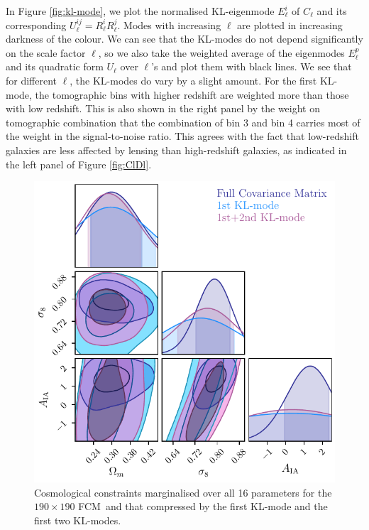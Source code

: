 \documentclass[twocolumn]{\docclass}
\newcommand{\rf}[1]{Figure \ref{fig:#1}}
\newcommand\full{FCM}
\begin{document}
	In \rf{kl-mode}, we plot the normalised KL-eigenmode $E_\ell^i$ of $C_{\ell}$ and its corresponding $U^{ij}_\ell=R_\ell^i R_\ell^j$. Modes with increasing $\ell$ are plotted in increasing darkness of the colour. We can see that the KL-modes do not depend significantly on the scale factor $\ell$, so we also take the weighted average of the eigenmodes $E_\ell^p$ and its quadratic form $U_\ell$ over $\ell$'s and plot them with black lines. 	We see that for different $\ell$, the KL-modes do vary by a slight amount. For the first KL-mode, the tomographic bins with higher redshift are weighted more than those with low redshift. This is also shown in the right panel by the weight on tomographic combination that the combination of bin 3 and bin 4 carries most of the weight in the signal-to-noise ratio. This agrees with the fact that low-redshift galaxies are less affected by lensing than high-redshift galaxies, as indicated in the left panel of \rf{ClDl}.
	
	\begin{figure}[b]
		\includegraphics[width=\columnwidth]{CompKL-constraints_wmS8A.pdf}
		\caption{Cosmological constraints marginalised over all 16 parameters for the  $190 \times 190$ \full\ and that compressed by the first KL-mode and the first two KL-modes.\label{fig:CompKL-constraints_wmS8A}}
	\end{figure}
	
\end{document}
